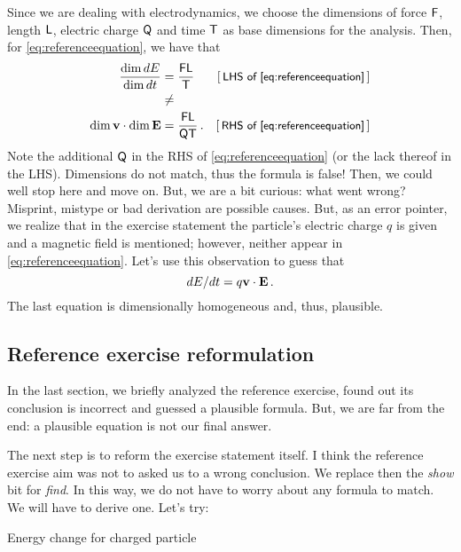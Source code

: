 Since we are dealing with electrodynamics, we choose the dimensions of force $\mathsf{F}$, length $\mathsf{L}$, electric charge $\mathsf{Q}$ and time $\mathsf{T}$ as base dimensions for the analysis. Then, for \cref{eq:referenceequation}, we have that
%
\begin{align*}
%
  \dfrac{\dim dE}{\dim dt} &= \dfrac{\phdim{FL}}{\phdim{T}} & \eqtxt{LHS of \cref{eq:referenceequation}} \\
  &\not= & \\
  \dim{\mathbf{v}}\iprod\dim{\mathbf{E}} &= \dfrac{\phdim{FL}}{\phdim{QT}}\,. & \eqtxt{RHS of \cref{eq:referenceequation}}
%
\end{align*}
%
Note the additional $\mathsf{Q}$ in the RHS of \cref{eq:referenceequation} (or the lack thereof in the LHS). Dimensions do not match, thus the formula is false! Then, we could well stop here and move on. But, we are a bit curious: what went wrong? Misprint, mistype or bad derivation are possible causes. But, as an error pointer, we realize that in the exercise statement the particle's electric charge $q$ is given and a magnetic field is mentioned; however, neither appear in \cref{eq:referenceequation}. Let's use this observation to guess that
%
\begin{equation}\label{eq:plausibleequation}
  dE/dt = q\mathbf{v}\cdot\mathbf{E}\,.
\end{equation}
%
The last equation is dimensionally homogeneous and, thus, plausible.


\subsection{Reference exercise reformulation}
%
In the last section, we briefly analyzed the reference exercise, found out its conclusion is incorrect and guessed a plausible formula. But, we are far from the end: a plausible equation is not our final answer.

The next step is to reform the exercise statement itself. I think the reference exercise aim was not to asked us to  a wrong conclusion. We replace then the \emph{show} bit for \emph{find}. In this way, we do not have to worry about any formula to match. We will have to derive one. Let's try:
%
\begin{description}
%
\item[Energy change for charged particle] 
%
\end{description}
%


